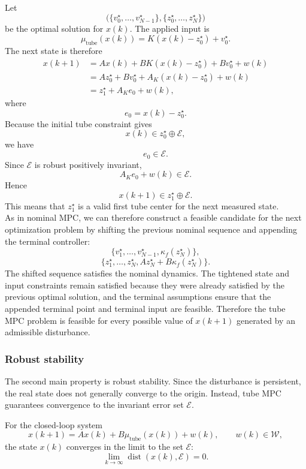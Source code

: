 Let
\[
    \bigl(\{v_0^\star,\ldots,v_{N-1}^\star\},
    \{z_0^\star,\ldots,z_N^\star\}\bigr)
\]
be the optimal solution for \(x(k)\). The applied input is
\[
    \mu_{\mathrm{tube}}(x(k))
    =
    K(x(k)-z_0^\star)+v_0^\star.
\]
The next state is therefore
\[
\begin{aligned}
    x(k+1)
    &=
    Ax(k)+BK(x(k)-z_0^\star)+Bv_0^\star+w(k)       \\
    &=
    Az_0^\star+Bv_0^\star
    +
    A_K(x(k)-z_0^\star)+w(k)                       \\
    &=
    z_1^\star+A_Ke_0+w(k),
\end{aligned}
\]
where
\[
    e_0=x(k)-z_0^\star.
\]
Because the initial tube constraint gives
\[
    x(k)\in z_0^\star\oplus\mathcal E,
\]
we have
\[
    e_0\in\mathcal E.
\]
Since \(\mathcal E\) is robust positively invariant,
\[
    A_Ke_0+w(k)\in\mathcal E.
\]
Hence
\[
    x(k+1)\in z_1^\star\oplus\mathcal E.
\]
This means that \(z_1^\star\) is a valid first tube center for the next measured state.\\

As in nominal MPC, we can therefore construct a feasible candidate for the next optimization
problem by shifting the previous nominal sequence and appending the terminal controller:
\[
    \{v_1^\star,\ldots,v_{N-1}^\star,\kappa_f(z_N^\star)\},
\]
\[
    \{z_1^\star,\ldots,z_N^\star,Az_N^\star+B\kappa_f(z_N^\star)\}.
\]
The shifted sequence satisfies the nominal dynamics. The tightened state and input constraints
remain satisfied because they were already satisfied by the previous optimal solution, and the
terminal assumptions ensure that the appended terminal point and terminal input are feasible.
Therefore the tube MPC problem is feasible for every possible value of \(x(k+1)\) generated by
an admissible disturbance.

\subsubsection{Robust stability}

The second main property is robust stability. Since the disturbance is persistent, the real state
does not generally converge to the origin. Instead, tube MPC guarantees convergence to the
invariant error set \(\mathcal E\).

\begin{theorembox}
For the closed-loop system
\[
    x(k+1)=Ax(k)+B\mu_{\mathrm{tube}}(x(k))+w(k),
    \qquad
    w(k)\in\mathcal W,
\]
the state \(x(k)\) converges in the limit to the set \(\mathcal E\):
\[
    \lim_{k\to\infty}\operatorname{dist}(x(k),\mathcal E)=0.
\]
\end{theorembox}

